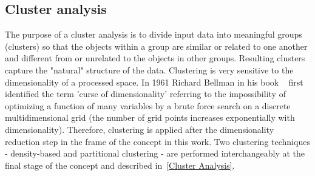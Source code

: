 \subsection{Cluster analysis}
The purpose of a cluster analysis is to divide input data into meaningful groups (clusters) so that the objects within a group are similar or related to one another and different from or unrelated to the objects in other groups. Resulting clusters capture the "natural" structure of the data. Clustering is very sensitive to the dimensionality of a processed space. In 1961 Richard Bellman in his book ~\cite{bellman2015adaptive} first identified the term 'curse of dimensionality' referring to the impossibility of optimizing a function of many variables by a brute force search on a discrete multidimensional grid (the number of grid points increases exponentially with dimensionality). Therefore, clustering is applied after the dimensionality reduction step in the frame of the concept in this work. Two clustering techniques - density-based and partitional clustering - are performed interchangeably at the final stage of the concept and described in~\ref{Cluster Analysis}.

